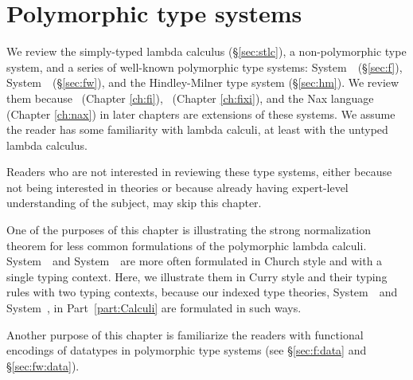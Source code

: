 \chapter{Polymorphic type systems}\label{ch:poly}
We review the simply-typed lambda calculus (\S\ref{sec:stlc}),
a non-polymorphic type system, and
a series of well-known polymorphic type systems:
System~\F\ (\S\ref{sec:f}), System~\Fw\ (\S\ref{sec:fw}),
and the Hindley-Milner type system (\S\ref{sec:hm}).
We review them because \Fi\ (Chapter \ref{ch:fi}),
\Fixi\ (Chapter \ref{ch:fixi}), and the Nax language (Chapter \ref{ch:nax})
in later chapters are extensions of these systems. We assume the reader has
some familiarity with lambda calculi, at least with the untyped lambda calculus.

Readers who are not interested in reviewing these type systems,
either because not being interested in theories
or because already having expert-level understanding of the subject,
may skip this chapter.

One of the purposes of this chapter is illustrating
the strong normalization theorem for less common formulations of
the polymorphic lambda calculi. System~\F\ and System~\Fw\ are more often
formulated in Church style and with a single typing context. Here,
we illustrate them in Curry style and their typing rules with two
typing contexts, because our indexed type theories, System~\Fi\ and
System~\Fixi, in Part~\ref{part:Calculi} are formulated in such ways.

Another purpose of this chapter is familiarize the readers with
functional encodings of datatypes in polymorphic type systems
(see \S\ref{sec:f:data} and \S\ref{sec:fw:data}).



